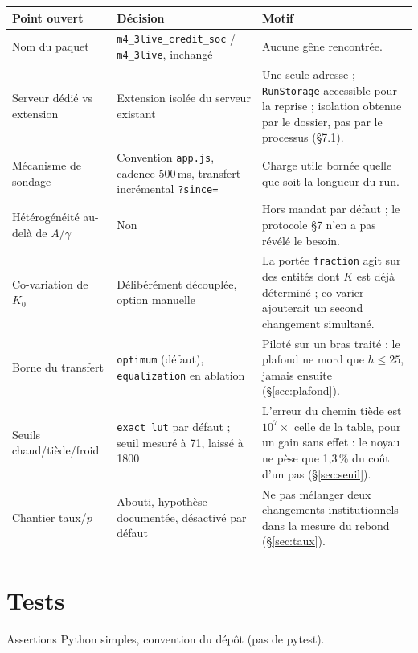 \documentclass[11pt,a4paper]{article}
\newcommand{\code}[1]{\texttt{#1}}
\begin{document}
\begin{longtable}{@{}p{4.6cm}p{5.2cm}p{6.2cm}@{}}
\toprule
\textbf{Point ouvert} & \textbf{Décision} & \textbf{Motif} \\
\midrule
\endhead
Nom du paquet & \code{m4\_3live\_credit\_soc} / \code{m4\_3live}, inchangé
& Aucune gêne rencontrée. \\
Serveur dédié vs extension & Extension isolée du serveur existant
& Une seule adresse ; \code{RunStorage} accessible pour la reprise ;
isolation obtenue par le dossier, pas par le processus (§7.1). \\
Mécanisme de sondage & Convention \code{app.js}, cadence 500\,ms,
transfert incrémental \code{?since=} & Charge utile bornée quelle que soit
la longueur du run. \\
Hétérogénéité au-delà de $A/\gamma$ & Non & Hors mandat par défaut ; le
protocole §7 n'en a pas révélé le besoin. \\
Co-variation de $K_0$ & Délibérément découplée, option manuelle
& La portée \code{fraction} agit sur des entités dont $K$ est déjà
déterminé ; co-varier ajouterait un second changement simultané. \\
Borne du transfert & \code{optimum} (défaut), \code{equalization} en
ablation & Piloté sur un bras traité : le plafond ne mord que $h\le25$,
jamais ensuite (§\ref{sec:plafond}). \\
Seuils chaud/tiède/froid & \code{exact\_lut} par défaut ; seuil mesuré à
71, laissé à 1800 & L'erreur du chemin tiède est $10^{7}\times$ celle de la
table, pour un gain sans effet : le noyau ne pèse que 1,3\,\% du coût d'un
pas (§\ref{sec:seuil}). \\
Chantier taux/$p$ & Abouti, hypothèse documentée, désactivé par défaut
& Ne pas mélanger deux changements institutionnels dans la mesure du
rebond (§\ref{sec:taux}). \\
\bottomrule
\end{longtable}

\section{Tests}

Assertions Python simples, convention du dépôt (pas de pytest).
\end{document}

